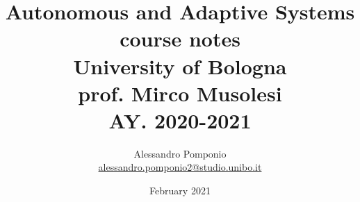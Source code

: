 \usepackage[utf8]{inputenc}
\usepackage{amsmath}
\usepackage{amssymb}
\usepackage{parskip}                    %
\usepackage{verbatim}
\usepackage{graphicx}
\usepackage{hyperref}                   %
\usepackage{wrapfig}                    %
\usepackage{afterpage}                  %
\usepackage{bbm}                        %
\usepackage{bm}                         %
\usepackage{caption}                    %
\usepackage{subfigure}                  %
\usepackage{tocbibind}                  %
\usepackage{colortbl}                   %
\usepackage[
    backend=biber,
    style=alphabetic,
    sorting=ynt
]{biblatex}

\usepackage[ruled,vlined,dotocloa]{algorithm2e}

\newcommand\addemptypage{       %
    \null
    \thispagestyle{empty}
    \addtocounter{page}{-1}
    \newpage
    }

\newcommand{\source}[1]{\vspace{-5pt} \caption*{ Source: {#1}} }

\DeclareMathOperator*{\argmax}{argmax}



\graphicspath{ {./Images/} }

\title{Autonomous and Adaptive Systems \\
        course notes\\
        University of Bologna \\
        \large	 prof. Mirco Musolesi \\
        AY. 2020-2021}
\author{Alessandro Pomponio \\ \href{mailto:alessandro.pomponio2@studio.unibo.it}{alessandro.pomponio2@studio.unibo.it}}
\date{February 2021}



\maketitle
\clearpage
\addemptypage

